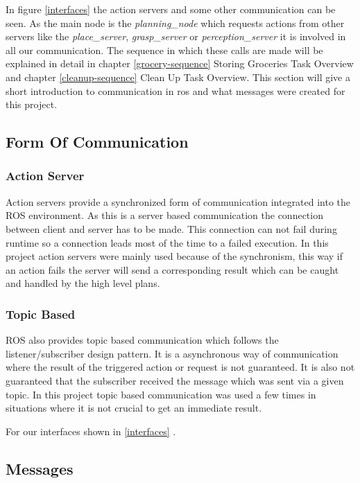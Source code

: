 \documentclass[main.tex]{subfiles}
\begin{document}
		In figure \ref{interfaces} the action servers and some other communication can be seen. As the main node is the \textit{planning\_node} which requests actions from other servers like the \textit{place\_server}, \textit{grasp\_server} or \textit{perception\_server} it is involved in all our communication. The sequence in which these calls are made will be explained in detail in chapter \ref{grocery-sequence} Storing Groceries Task Overview and chapter \ref{cleanup-sequence} Clean Up Task Overview. This section will give a short introduction to communication in ros and what messages were created for this project.

		\subsection{Form Of Communication}
		
			\subsubsection{Action Server}
			
			Action servers provide a synchronized form of communication integrated into the ROS environment. As this is a server based communication the connection between client and server has to be made. This connection can not fail during runtime so a connection leads most of the time to a failed execution. In this project action servers were mainly used because of the synchronism, this way if an action fails the server will send a corresponding result which can be caught and handled by the high level plans.
			
			\subsubsection{Topic Based}
			
			ROS also provides topic based communication which follows the listener/subscriber design pattern. It is a asynchronous way of communication where the result of the triggered action or request is not guaranteed. It is also not guaranteed that the subscriber received the message which was sent via a given topic. In this project topic based communication was used a few times in situations where it is not crucial to get an immediate result.  
		

		For our interfaces shown in \ref{interfaces} . 

		\subsection{Messages}
\end{document}
